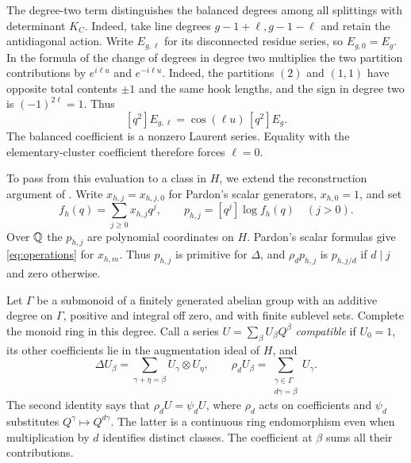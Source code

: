 The degree-two term distinguishes the balanced degrees among all
splittings with determinant $K_C$. Indeed, take line degrees
$g-1+\ell,g-1-\ell$ and retain the antidiagonal action. Write
$E_{g,\ell}$ for its disconnected residue series, so $E_{g,0}=E_g$.
In the formula of \cite[Corollary~7.2]{BP} the change of degrees in
degree two multiplies the two partition contributions by
$e^{i\ell u}$ and $e^{-i\ell u}$. Indeed, the partitions $(2)$ and
$(1,1)$ have opposite total contents $\pm1$ and the same hook
lengths, and the sign in degree two is $(-1)^{2\ell}=1$. Thus
\begin{equation}\label{eq:balance}
 [q^2]E_{g,\ell}=\cos(\ell u)\,[q^2]E_g .
\end{equation}
The balanced coefficient is a nonzero Laurent series. Equality
with the elementary-cluster coefficient therefore forces $\ell=0$.

To pass from this evaluation to a class in $H$, we extend the
reconstruction argument of \cite[\S2]{Transition}. Write
$x_{h,j}=x_{h,j,0}$ for Pardon's scalar generators,
$x_{h,0}=1$, and set
\[
 f_h(q)=\sum_{j\geq0}x_{h,j}q^j,\qquad
 p_{h,j}=[q^j]\log f_h(q)\quad(j>0).
\]
Over $\mathbb Q$ the $p_{h,j}$ are polynomial coordinates on $H$.
Pardon's scalar formulas \cite[Lemmas~4.12--4.13 and
Theorem~7.6]{Pardon} give \eqref{eq:operations} for $x_{h,m}$.
Thus $p_{h,j}$ is primitive for $\Delta$, and $\rho_d p_{h,j}$
is $p_{h,j/d}$ if $d\mid j$ and zero otherwise.

Let $\Gamma$ be a submonoid of a finitely generated abelian group with
an additive degree on $\Gamma$, positive and integral off zero, and
with finite sublevel sets. Complete the monoid ring in this degree.
Call a series
$U=\sum_\beta U_\beta Q^\beta$ \emph{compatible} if $U_0=1$, its
other coefficients lie in the augmentation ideal of $H$, and
\begin{equation}\label{eq:compat}
 \Delta U_\beta=\sum_{\gamma+\eta=\beta}U_\gamma\otimes U_\eta,
 \qquad \rho_d U_\beta=\sum_{\substack{\gamma\in\Gamma\\ d\gamma=\beta}}U_\gamma .
\end{equation}
The second identity says that $\rho_d U=\psi_d U$, where
$\rho_d$ acts on coefficients and $\psi_d$ substitutes
$Q^\gamma\mapsto Q^{d\gamma}$. The latter is a continuous ring
endomorphism even when multiplication by $d$ identifies distinct
classes. The coefficient at $\beta$ sums all their contributions.

